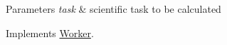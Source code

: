 \begin{DoxyParams}{Parameters}
{\em task} & scientific task to be calculated \\
\hline
\end{DoxyParams}


Implements \hyperlink{a00095_a78d4ec19f0ec658782263b3f64001f39}{Worker}.

